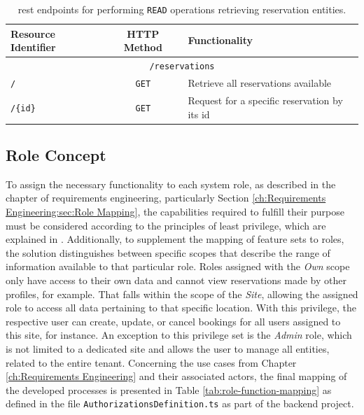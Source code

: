 \begingroup
\setlength{\tabcolsep}{10pt} %
\renewcommand{\arraystretch}{1.5} %
\begin{table}[h]
\centering
\caption{\acrshort{rest} endpoints for performing \texttt{READ} operations retrieving reservation entities.}
    \begin{tabular}{l|c|m{5cm}}
    Resource Identifier & HTTP Method & Functionality \\ \hline
    \multicolumn{3}{c}{\texttt{/reservations}} \\ \hline
    \texttt{/} & \texttt{GET} & Retrieve all reservations available \\
    \texttt{/\{id\}} & \texttt{GET} & Request for a specific reservation by its \acrshort{id} \\
    \end{tabular}
\label{tab:read-reservations-rest}
\end{table}
\endgroup

\newpage

\subsection{Role Concept}
\label{ch:Implementation:sec:Reservation System:ssec:Role Concept}

To assign the necessary functionality to each system role, as described in the chapter of requirements engineering, particularly Section \ref{ch:Requirements Engineering:sec:Role Mapping}, the capabilities required to fulfill their purpose must be considered according to the principles of least privilege, which are explained in \cite{ma_specifying_2011}.
Additionally, to supplement the mapping of feature sets to roles, the solution distinguishes between specific scopes that describe the range of information available to that particular role.
Roles assigned with the \textit{Own} scope only have access to their own data and cannot view reservations made by other profiles, for example.
That falls within the scope of the \textit{Site}, allowing the assigned role to access all data pertaining to that specific location.
With this privilege, the respective user can create, update, or cancel bookings for all users assigned to this site, for instance. An exception to this privilege set is the \textit{Admin} role, which is not limited to a dedicated site and allows the user to manage all entities, related to the entire tenant. 
Concerning the use cases from Chapter \ref{ch:Requirements Engineering} and their associated actors, the final mapping of the developed processes is presented in Table \ref{tab:role-function-mapping} as defined in the file \texttt{AuthorizationsDefinition.ts} as part of the backend project.

